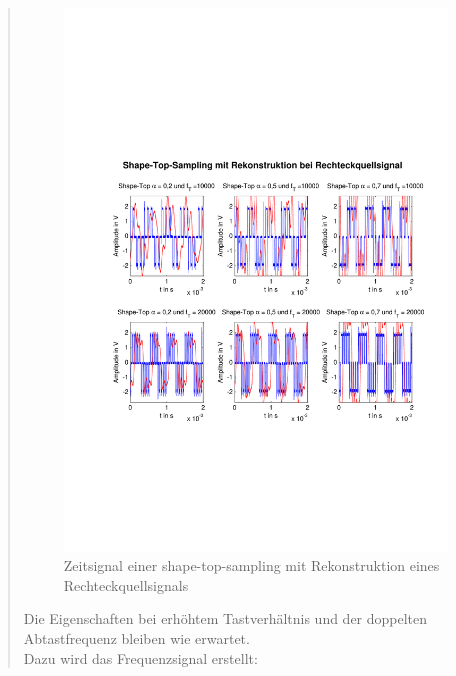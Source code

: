 \begin{quote}
    	
    	\begin{figure}[H]
    \centering
        \includegraphics[scale=0.7, trim = 0cm 0cm 0cm 0cm,
        clip]{./Bilder/shape-top-recht}
            \caption{Zeitsignal einer shape-top-sampling mit Rekonstruktion
            eines Rechteckquellsignals}
  	    \end{figure}
  	    
  	    Die Eigenschaften bei erhöhtem Tastverhältnis und der doppelten
  	    Abtastfrequenz bleiben wie erwartet.\\ 
  	    Dazu wird das Frequenzsignal erstellt:
    	

\end{quote}
